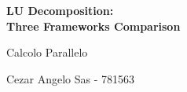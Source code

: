 \documentclass[12pt, a4paper, openright, oneside]{book}
\begin{document}
\begin{titlepage}
    \begin{center}
        \vspace*{1cm}
        
        \LARGE
        \textbf{LU Decomposition: \\ Three Frameworks Comparison}
        
        \vspace{0.5cm}
		\Large
        Calcolo Parallelo
        
        \vspace{1.5cm}
        \large
        Cezar Angelo Sas - 781563
                
    \end{center}
\end{titlepage}


\tableofcontents





\end{document}
